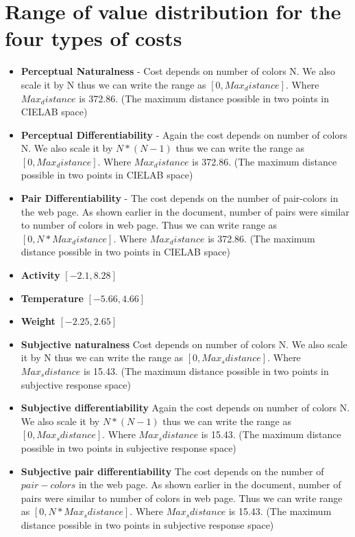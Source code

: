 \section{Range of value distribution for the four types of costs}
\label{Range}
\begin{itemize}
\item{\textbf{Perceptual Naturalness}} - Cost depends on number of colors N. We also scale it by N thus we can write the range as $[0, Max_distance]$. Where $Max_distance$ is 372.86. (The maximum distance possible in two points in CIELAB space)

\item{\textbf{Perceptual Differentiability}} - Again the cost depends on number of colors N. We also scale it by $N*(N-1)$ thus we can write the range as $[0, Max_distance]$. Where $Max_distance$ is 372.86. (The maximum distance possible in two points in CIELAB space)

\item{\textbf{Pair Differentiability}} - The cost depends on the number of pair-colors in the web page. As shown earlier in the document, number of pairs were similar to number of colors in web page. Thus we can write range as $[0, N*Max_distance]$. Where $Max_distance$ is 372.86. (The maximum distance possible in two points in CIELAB space)

\item{\textbf{Activity}} $[-2.1, 8.28]$

\item{\textbf{Temperature}} $[-5.66, 4.66]$

\item{\textbf{Weight}} $[-2.25, 2.65]$

\item{\textbf{Subjective naturalness}} Cost depends on number of colors N. We also scale it by N thus we can write the range as $[0, Max_sdistance]$. Where $Max_sdistance$ is 15.43. (The maximum distance possible in two points in subjective response space)

\item{\textbf{Subjective differentiability}} Again the cost depends on number of colors N. We also scale it by $N*(N-1)$ thus we can write the range as $[0, Max_sdistance]$. Where $Max_sdistance$ is 15.43. (The maximum distance possible in two points in subjective response space)

\item{\textbf{Subjective pair differentiability}} The cost depends on the number of $pair-colors$ in the web page. As shown earlier in the document, number of pairs were similar to number of colors in web page. Thus we can write range as $[0, N*Max_sdistance]$. Where $Max_sdistance$ is 15.43. (The maximum distance possible in two points in subjective response space)

\end{itemize}



